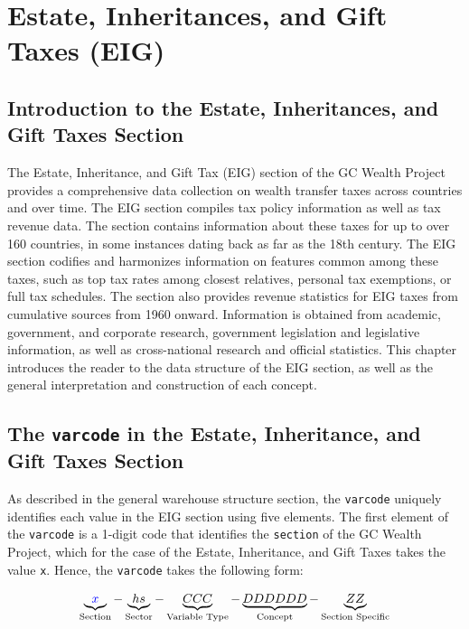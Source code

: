 \documentclass[
]{article}
\author{}
\date{\vspace{-2.5em}}
\begin{document}
\section{Estate, Inheritances, and Gift Taxes (EIG)}\label{sec:eig}

\subsection{Introduction to the Estate, Inheritances, and Gift Taxes
Section}\label{introduction-to-the-estate-inheritances-and-gift-taxes-section}

The Estate, Inheritance, and Gift Tax (EIG) section of the GC Wealth
Project provides a comprehensive data collection on wealth transfer
taxes across countries and over time. The EIG section compiles tax
policy information as well as tax revenue data. The section contains
information about these taxes for up to over 160 countries, in some
instances dating back as far as the 18th century. The EIG section
codifies and harmonizes information on features common among these
taxes, such as top tax rates among closest relatives, personal tax
exemptions, or full tax schedules. The section also provides revenue
statistics for EIG taxes from cumulative sources from 1960 onward.
Information is obtained from academic, government, and corporate
research, government legislation and legislative information, as well as
cross-national research and official statistics. This chapter introduces
the reader to the data structure of the EIG section, as well as the
general interpretation and construction of each concept.

\subsection{\texorpdfstring{The \texttt{varcode} in the Estate,
Inheritance, and Gift Taxes
Section}{The varcode in the Estate, Inheritance, and Gift Taxes Section}}\label{the-varcode-in-the-estate-inheritance-and-gift-taxes-section}

As described in the general warehouse structure section, the
\texttt{varcode} uniquely identifies each value in the EIG section using
five elements. The first element of the \texttt{varcode} is a 1-digit
code that identifies the \texttt{section} of the GC Wealth Project,
which for the case of the Estate, Inheritance, and Gift Taxes takes the
value \texttt{x}. Hence, the \texttt{varcode} takes the following form:

\begin{equation}
\notag \underbrace{\textcolor{blue}{x}}_{\text{Section}} - \underbrace{hs}_{\text{Sector}} - \underbrace{CCC}_{\text{Variable Type}} - \underbrace{DDDDDD}_{\text{Concept}} - \underbrace{ZZ}_{\text{Section Specific}} 
\end{equation}
\end{document}
